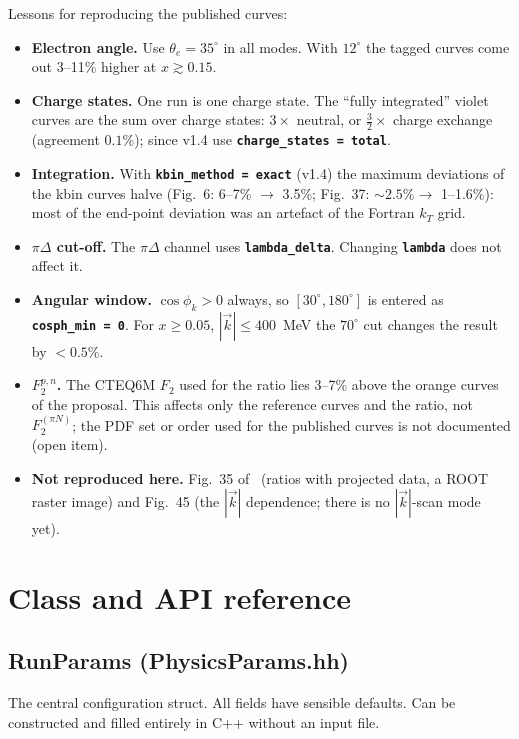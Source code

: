 \documentclass[11pt,a4paper]{article}
\newcommand{\inikey}[1]{\texttt{\textbf{#1}}}
\begin{document}
Lessons for reproducing the published curves:
\begin{itemize}
\item \textbf{Electron angle.}  Use $\theta_e=35^\circ$ in all modes.
  With $12^\circ$ the tagged curves come out 3--11\% higher at
  $x\gtrsim0.15$.
\item \textbf{Charge states.}  One run is one charge state.  The
  ``fully integrated'' violet curves are the sum over charge states:
  $3\times$ neutral, or $\tfrac32\times$ charge exchange (agreement $0.1\%$);
  since v1.4 use \inikey{charge\_states = total}.
\item \textbf{Integration.}  With \inikey{kbin\_method = exact} (v1.4) the
  maximum deviations of the kbin curves halve (Fig.~6: 6--7\% $\to$ 3.5\%;
  Fig.~37: $\sim2.5\%\to$ 1--1.6\%): most of the end-point deviation was an
  artefact of the Fortran $k_T$ grid.
\item \textbf{$\pi\Delta$ cut-off.}  The $\pi\Delta$ channel uses
  \inikey{lambda\_delta}.  Changing \inikey{lambda} does not affect it.
\item \textbf{Angular window.}  $\cos\phi_k>0$ always, so
  $[30^\circ,180^\circ]$ is entered as \inikey{cosph\_min = 0}.  For
  $x\ge0.05$, $|\vec k|\le400$~MeV the $70^\circ$ cut changes the result
  by $<0.5\%$.
\item \textbf{$F_2^{p,n}$.}  The CTEQ6M $F_2$ used for the ratio lies
  3--7\% above the orange curves of the proposal.  This affects only the
  reference curves and the ratio, not $F_2^{(\pi N)}$; the PDF set or
  order used for the published curves is not documented (open item).
\item \textbf{Not reproduced here.}  Fig.~35 of~\cite{TDIS15} (ratios with
  projected data, a ROOT raster image) and Fig.~45 (the $|\vec k|$
  dependence; there is no $|\vec k|$-scan mode yet).
\end{itemize}

\section{Class and API reference}

\subsection{RunParams (PhysicsParams.hh)}

The central configuration struct.  All fields have sensible defaults.
Can be constructed and filled entirely in C++ without an input file.
\end{document}
